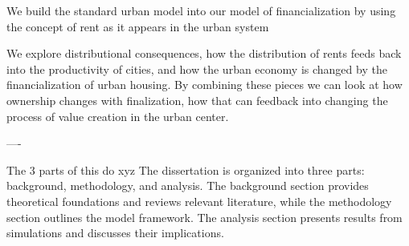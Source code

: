 








We build the  standard urban model into our model of financialization by using the concept of rent as it appears in the urban system


We explore distributional consequences, how the distribution of rents feeds back into the productivity of cities, and how the urban economy is changed by the financialization of urban housing. %
By combining these pieces we can look at how ownership changes with finalization, how that can feedback into changing the process of value creation in the urban center.





----

The 3 parts of this do xyz
The dissertation is organized into three parts: background, methodology, and analysis. The background section provides theoretical foundations and reviews relevant literature, while the methodology section outlines the model framework. The analysis section presents results from simulations and discusses their implications.




